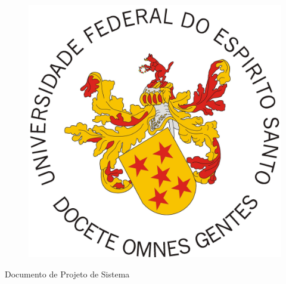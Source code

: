 \documentclass[
	12pt,				
	oneside,		
	a4paper,			
	english,			%
	french,				%
	spanish,			%
	brazil				%
	]{abntex2}
\newcommand{\subtitulo}{Documento de Projeto de Sistema}
\renewcommand{\imprimircapa}{%
	\begin{capa}%
		\center
		
		{\ABNTEXchapterfont\large\subtitulo{}}
		\vfill
		\begin{center}
			\ABNTEXchapterfont\bfseries\LARGE\imprimirtitulo
		\end{center}
		
		\vfill
		\large\imprimirlocal
		\linebreak
		\large\imprimirdata
		\vspace*{1cm}
	\end{capa}
}
\begin{document}
\frenchspacing

\begin{figure}[h]
  \centering
  \includegraphics[scale=0.055]{brasao.jpg}
  \label{ppts3}
\end{figure} 

\imprimircapa
\end{document}
